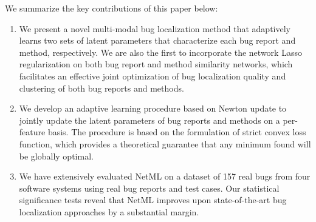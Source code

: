 We summarize the key contributions of this paper below:

\begin{enumerate}
\item We present a novel multi-modal bug localization method that adaptively learns two sets of latent parameters that characterize each bug report and method, respectively. We are also the first to incorporate the network Lasso regularization on both bug report and method similarity networks, which facilitates an effective joint optimization of bug localization quality and clustering of both bug reports and methods.  
\item We develop an adaptive learning procedure based on Newton update to jointly update the latent parameters of bug reports and methods on a per-feature basis. The procedure is based on the formulation of strict convex loss function, which provides a theoretical guarantee that any minimum found will be globally optimal. %
\item We have extensively evaluated NetML on a dataset of 157 real bugs from four software systems using real bug reports and test cases. Our statistical significance tests reveal that NetML improves upon state-of-the-art bug localization approaches by a substantial margin.
\end{enumerate}


	



